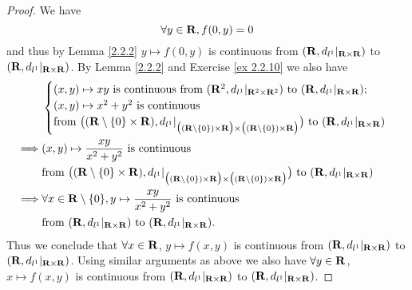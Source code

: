 \begin{proof}
    We have
    \[
        \forall y \in \mathbf{R}, f(0, y) = 0
    \]
    and thus by Lemma \ref{2.2.2} \(y \mapsto f(0, y)\) is continuous from \((\mathbf{R}, d_{l^1}|_{\mathbf{R} \times \mathbf{R}})\) to \((\mathbf{R}, d_{l^1}|_{\mathbf{R} \times \mathbf{R}})\).
    By Lemma \ref{2.2.2} and Exercise \ref{ex 2.2.10} we also have
    \begin{align*}
                 & \begin{cases}
                       (x, y) \mapsto x y \text{ is continuous from } (\mathbf{R}^2, d_{l^1}|_{\mathbf{R}^2 \times \mathbf{R}^2}) \text{ to } (\mathbf{R}, d_{l^1}|_{\mathbf{R} \times \mathbf{R}}); \\
                       (x, y) \mapsto x^2 + y^2 \text{ is continuous}                                                                                \\
                       \text{from } \big((\mathbf{R} \setminus \{0\} \times \mathbf{R}), d_{l^1}|_{\big((\mathbf{R} \setminus \{0\}) \times \mathbf{R}\big) \times \big((\mathbf{R} \setminus \{0\}) \times \mathbf{R}\big)}\big) \text{ to } (\mathbf{R}, d_{l^1}|_{\mathbf{R} \times \mathbf{R}})
                   \end{cases}  \\
        \implies & (x, y) \mapsto \frac{xy}{x^2 + y^2} \text{ is continuous}                                                                                                                                            \\
                 & \text{from } \big((\mathbf{R} \setminus \{0\} \times \mathbf{R}), d_{l^1}|_{\big((\mathbf{R} \setminus \{0\}) \times \mathbf{R}\big) \times \big((\mathbf{R} \setminus \{0\}) \times \mathbf{R}\big)}\big) \text{ to } (\mathbf{R}, d_{l^1}|_{\mathbf{R} \times \mathbf{R}}) \\
        \implies & \forall x \in \mathbf{R} \setminus \{0\}, y \mapsto \frac{xy}{x^2 + y^2} \text{ is continuous}                                                                                                               \\
                 & \text{from } (\mathbf{R}, d_{l^1}|_{\mathbf{R} \times \mathbf{R}}) \text{ to } (\mathbf{R}, d_{l^1}|_{\mathbf{R} \times \mathbf{R}}).
    \end{align*}
    Thus we conclude that \(\forall x \in \mathbf{R}\), \(y \mapsto f(x, y)\) is continuous from \((\mathbf{R}, d_{l^1}|_{\mathbf{R} \times \mathbf{R}})\) to \((\mathbf{R}, d_{l^1}|_{\mathbf{R} \times \mathbf{R}})\).
    Using similar arguments as above we also have \(\forall y \in \mathbf{R}\), \(x \mapsto f(x, y)\) is continuous from \((\mathbf{R}, d_{l^1}|_{\mathbf{R} \times \mathbf{R}})\) to \((\mathbf{R}, d_{l^1}|_{\mathbf{R} \times \mathbf{R}})\).


\end{proof}

